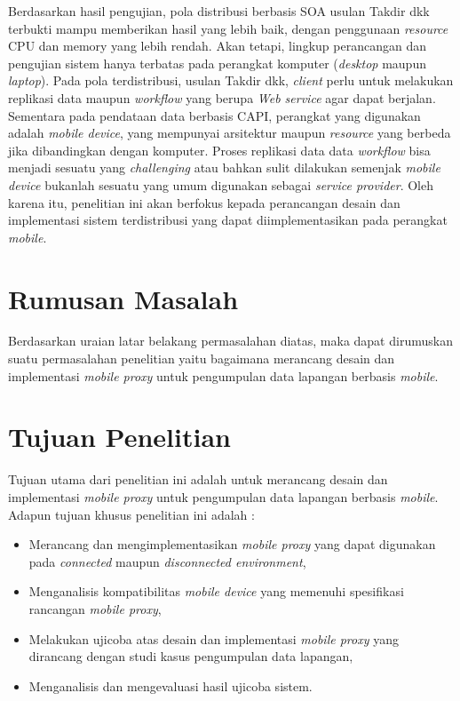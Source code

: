 Berdasarkan hasil pengujian, pola distribusi berbasis SOA usulan Takdir dkk terbukti mampu memberikan hasil yang lebih baik, dengan penggunaan \textit{resource} CPU dan memory yang lebih rendah. Akan tetapi, lingkup perancangan dan pengujian sistem hanya terbatas pada perangkat komputer (\textit{desktop} maupun \textit{laptop}). Pada pola terdistribusi, usulan Takdir dkk, \textit{client} perlu untuk melakukan replikasi data maupun \textit{workflow} yang berupa \textit{Web service} agar dapat berjalan. Sementara pada pendataan data berbasis CAPI, perangkat yang digunakan adalah \textit{mobile device}, yang mempunyai arsitektur maupun \textit{resource} yang berbeda jika dibandingkan dengan komputer. Proses replikasi data data \textit{workflow} bisa menjadi sesuatu yang \textit{challenging} atau bahkan sulit dilakukan semenjak \textit{mobile device} bukanlah sesuatu yang umum digunakan sebagai \textit{service provider}.	Oleh karena itu, penelitian ini akan berfokus kepada perancangan desain dan implementasi sistem terdistribusi yang  dapat diimplementasikan pada perangkat \textit{mobile}.

\section{Rumusan Masalah}
Berdasarkan uraian latar belakang permasalahan diatas, maka dapat dirumuskan suatu permasalahan penelitian yaitu bagaimana merancang desain dan implementasi \textit{mobile proxy} untuk pengumpulan data lapangan berbasis \textit{mobile}.

\section{Tujuan Penelitian}
Tujuan utama dari penelitian ini adalah untuk merancang desain dan implementasi \textit{mobile proxy} untuk pengumpulan data lapangan berbasis \textit{mobile}. Adapun tujuan khusus penelitian ini adalah :
\begin{itemize}
\item Merancang dan mengimplementasikan \textit{mobile proxy} yang dapat digunakan pada \textit{connected} maupun \textit{disconnected environment},
\item Menganalisis kompatibilitas \textit{mobile device} yang memenuhi spesifikasi rancangan \textit{mobile proxy},
\item Melakukan ujicoba atas desain dan implementasi \textit{mobile proxy} yang dirancang dengan studi kasus pengumpulan data lapangan,
\item Menganalisis dan mengevaluasi hasil ujicoba sistem.
\end{itemize}

